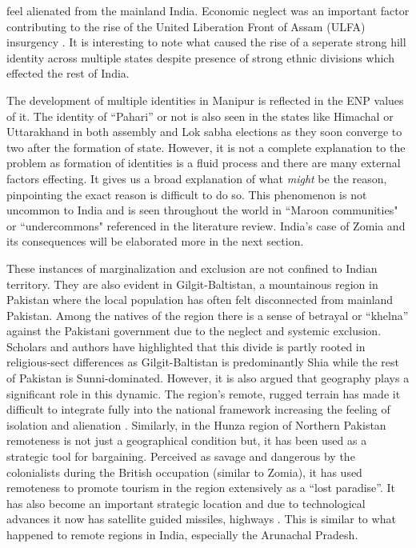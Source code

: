 \begin{sloppypar}
feel alienated from the mainland India. Economic neglect was an important factor contributing to the rise of the United Liberation Front of Assam (ULFA) insurgency \citep{chima2023insurgency}. It is interesting to note what caused the rise of a seperate strong hill identity across multiple states despite presence of strong ethnic divisions which effected the rest of India. 
    
\end{sloppypar}

The development of multiple identities in Manipur is reflected in the ENP values of it. The identity of ``Pahari'' or not is also seen in the states like Himachal or Uttarakhand in both assembly and Lok sabha elections as they soon converge to two after the formation of state. However, it is not a complete explanation to the problem as formation of identities is a fluid process and there are many external factors effecting. It gives us a broad explanation of what \textit{might} be the reason, pinpointing the exact reason is difficult to do so.
This phenomenon is not uncommon to India and is seen throughout the world in ``Maroon communities"  or ``undercommons" referenced in the literature review. India's case of Zomia and its consequences will be elaborated more in the next section. 



 \vspace{0.3cm}

 These instances of marginalization and exclusion are not confined to Indian territory. They are also evident in Gilgit\hyp{}Baltistan, a mountainous region in Pakistan where the local population has often felt disconnected from mainland Pakistan. Among the natives of the region there is a sense of betrayal or \enquote{khelna} against the Pakistani government due to the neglect and systemic exclusion. Scholars and authors have highlighted that this divide is partly rooted in religious\hyp{}sect differences as Gilgit\hyp{}Baltistan is predominantly Shia while the rest of Pakistan is  Sunni\hyp{}dominated. However, it is also argued that geography plays a significant role in this dynamic. The region's remote, rugged terrain has  made it difficult to integrate fully into the national framework  increasing the feeling of isolation and alienation \citep{ali2019delusional}. Similarly, in the Hunza region of Northern Pakistan  remoteness is not just a geographical condition but, it has been used as a strategic tool for bargaining. Perceived as savage and dangerous by the colonialists during the British occupation (similar to Zomia), it has used remoteness to promote tourism in the region extensively as a \enquote{lost paradise}. It has also become an important strategic location and due to technological  advances it now has satellite guided missiles, highways \citep{hussain2015remoteness}. This is similar to what happened to remote regions in India, especially the Arunachal Pradesh.


